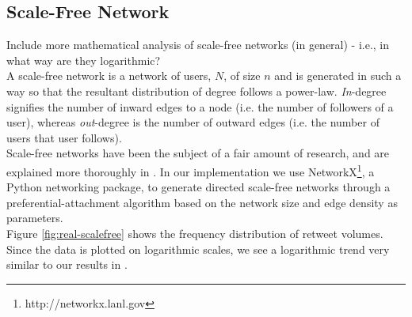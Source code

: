 \subsection{Scale-Free Network}
Include more mathematical analysis of scale-free networks (in general) - i.e., in what way are they logarithmic?
\\
A scale-free network is a network of users, $ N $, of size $ n $ and is generated in such a way so that the resultant distribution of degree follows a power-law. \emph{In}-degree signifies the number of inward edges to a node (i.e. the number of followers of a user), whereas \emph{out}-degree is the number of outward edges (i.e. the number of users that user follows).
\\
Scale-free networks have been the subject of a fair amount of research, and are explained more thoroughly in \cite{hein06}. In our implementation we use NetworkX\footnote{http://networkx.lanl.gov}, a Python networking package, to generate directed scale-free networks through a preferential-attachment algorithm based on the network size and edge density as parameters.
\\
Figure \ref{fig:real-scalefree} shows the frequency distribution of retweet volumes. Since the data is plotted on logarithmic scales, we see a logarithmic trend very similar to our results in \cite{webberley11}.
%    
